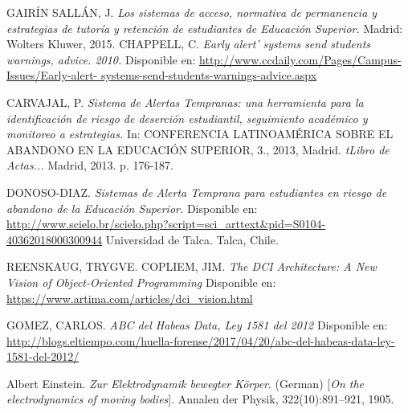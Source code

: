 
\begin{thebibliography}{}


GAIRÍN SALLÁN, J.
\textit{Los sistemas de acceso, normativa de permanencia y estrategias de tutoría y retención de estudiantes de Educación Superior.} Madrid: Wolters Kluwer, 2015.
CHAPPELL, C. 
\textit{Early alert’ systems send students warnings, advice. 2010.} Disponible en: \url{http://www.ccdaily.com/Pages/Campus-Issues/Early-alert- systems-send-students-warnings-advice.aspx}

CARVAJAL, P.
\textit{Sistema de Alertas Tempranas: una herramienta para la identificación de riesgo de deserción estudiantil, seguimiento académico y monitoreo a estrategias.} In: CONFERENCIA LATINOAMÉRICA SOBRE EL ABANDONO EN LA EDUCACIÓN SUPERIOR, 3., 2013, Madrid. \textit{tLibro de Actas...} Madrid, 2013. p. 176-187.

DONOSO-DIAZ.
\textit{Sistemas de Alerta Temprana para estudiantes en riesgo de abandono de la Educación Superior.}
Disponible en:
\url{http://www.scielo.br/scielo.php?script=sci\_arttext&pid=S0104-40362018000300944}
Universidad de Talca. Talca, Chile.

 REENSKAUG, TRYGVE.
 COPLIEM, JIM.
\textit{The DCI Architecture: A New Vision of Object-Oriented Programming}
Disponible en:
\url{https://www.artima.com/articles/dci_vision.html}

 GOMEZ, CARLOS.
\textit{ABC del Habeas Data, Ley 1581 del 2012}
Disponible en:
\url{http://blogs.eltiempo.com/huella-forense/2017/04/20/abc-del-habeas-data-ley-1581-del-2012/}




Albert Einstein. 
\textit{Zur Elektrodynamik bewegter K{\"o}rper}. (German) 
[\textit{On the electrodynamics of moving bodies}]. 
Annalen der Physik, 322(10):891–921, 1905.

\end{thebibliography}